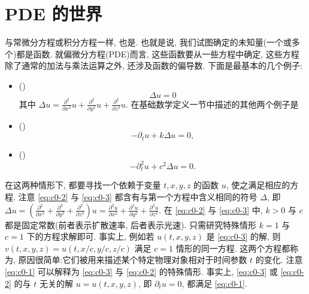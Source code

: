 \section{PDE 的世界}

与常微分方程或积分方程一样, 也是.
也就是说, 我们试图确定的未知量(一个或多个)都是函数.
就偏微分方程(PDE)而言, 这些函数要从一些方程中确定, 这些方程除了通常的加法与乘法运算之外, 还涉及函数的偏导数.
下面是最基本的几个例子:

\begin{itemize}
\item ()
\begin{equation}\label{eq:c0-1}
\Delta u = 0
\end{equation}
其中 $\Delta u = \frac{\partial^{2}}{\partial x^{2}} u + \frac{\partial^{2}}{\partial y^{2}} u + \frac{\partial^{2}}{\partial z^{2}} u$.
在基础数学定义一节中描述的其他两个例子是
\item ()
\begin{equation}\label{eq:c0-2}
-\partial_{t} u + k \Delta u = 0,
\end{equation}
\item ()
\begin{equation}\label{eq:c0-3}
-\partial_{t}^{2} u + c^{2} \Delta u = 0.
\end{equation}
\end{itemize}

在这两种情形下, 都要寻找一个依赖于变量 $t, x, y, z$ 的函数 $u$, 使之满足相应的方程.
注意 \eqref{eq:c0-2} 与 \eqref{eq:c0-3} 都含有与第一个方程中含义相同的符号 $\Delta$, 即
$\Delta u = \left(\frac{\partial^{2}}{\partial x^{2}} + \frac{\partial^{2}}{\partial y^{2}} + \frac{\partial^{2}}{\partial z^{2}}\right) u = \frac{\partial^{2} u}{\partial x^{2}} + \frac{\partial^{2} u}{\partial y^{2}} + \frac{\partial^{2} u}{\partial z^{2}}$.
在 \eqref{eq:c0-2} 与 \eqref{eq:c0-3} 中, $k>0$ 与 $c$ 都是固定常数(前者表示扩散速率, 后者表示光速).
只需研究特殊情形 $k = 1$ 与 $c = 1$ 下的方程求解即可.
事实上, 例如若 $u(t, x, y, z)$ 是 \eqref{eq:c0-3} 的解, 则 $v(t, x, y, z) = u(t, x/c, y/c, z/c)$ 满足 $c = 1$ 情形的同一方程.
这两个方程都称为, 原因很简单:它们被用来描述某个特定物理对象相对于时间参数 $t$ 的变化.
注意 \eqref{eq:c0-1} 可以解释为 \eqref{eq:c0-3} 与 \eqref{eq:c0-2} 的特殊情形.
事实上, \eqref{eq:c0-3} 或 \eqref{eq:c0-2} 的与 $t$ 无关的解 $u = u(t, x, y, z)$, 即 $\partial_{t} u = 0$, 都满足 \eqref{eq:c0-1}.

